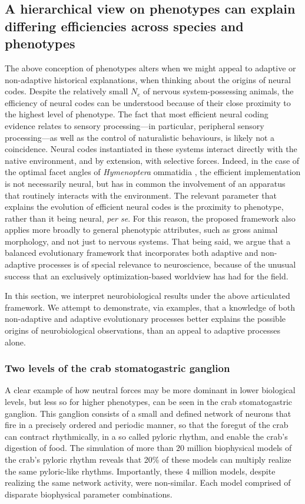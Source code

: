 \documentclass[twocolumn]{article}
\begin{document}
\subsection{A hierarchical view on phenotypes can explain differing efficiencies across species and phenotypes}

The above conception of phenotypes alters when we might appeal to adaptive or non-adaptive historical explanations, when thinking about the origins of neural codes. Despite the relatively small $N_e$ of nervous system-possessing animals, the efficiency of neural codes can be understood because of their close proximity to the highest level of phenotype. The fact that most efficient neural coding evidence relates to sensory processing---in particular, peripheral sensory processing---as well as the control of naturalistic behaviours, is likely not a coincidence. Neural codes instantiated in these systems interact directly with the native environment, and by extension, with selective forces. Indeed, in the case of the optimal facet angles of \textit{Hymenoptera} ommatidia \cite{barlow_1952}, the efficient implementation is not necessarily neural, but has in common the involvement of an apparatus that routinely interacts with the environment. The relevant parameter that explains the evolution of efficient neural codes is the proximity to phenotype, rather than it being neural, \textit{per se}. For this reason, the proposed framework also applies more broadly to general phenotypic attributes, such as gross animal morphology, and not just to nervous systems. That being said, we argue that a balanced evolutionary framework that incorporates both adaptive and non-adaptive processes is of special relevance to neuroscience, because of the unusual success that an exclusively optimization-based worldview has had for the field.

In this section, we interpret neurobiological results under the above articulated framework. We attempt to demonstrate, via examples, that a knowledge of both non-adaptive and adaptive evolutionary processes better explains the possible origins of neurobiological observations, than an appeal to adaptive processes alone. 

\subsubsection{Two levels of the crab stomatogastric ganglion}

A clear example of how neutral forces may be more dominant in lower biological levels, but less so for higher phenotypes, can be seen in the crab stomatogastric ganglion. This ganglion consists of a small and defined network of neurons that fire in a precisely ordered and periodic manner, so that the foregut of the crab can contract rhythmically, in a so called pyloric rhythm, and enable the crab's digestion of food. The simulation of more than 20 million biophysical models of the crab's pyloric rhythm reveals that 20\% of these models can multiply realize the same pyloric-like rhythms. Importantly, these 4 million models, despite realizing the same network activity, were non-similar. Each model comprised of disparate biophysical parameter combinations. 
\end{document}
